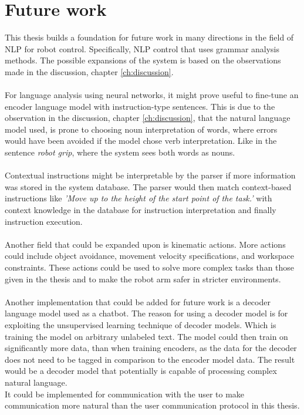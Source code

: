 \chapter{Future work} \label{ch:future_work}
This thesis builds a foundation for future work in many directions in the field of NLP for robot control. Specifically, NLP control that uses grammar analysis methods. The possible expansions of the system is based on the observations made in the discussion, chapter \ref{ch:discussion}.
\\\\
For language analysis using neural networks, it might prove useful to fine-tune an encoder language model with instruction-type sentences. This is due to the observation in the discussion, chapter \ref{ch:discussion}, that the natural language model used, is prone to choosing noun interpretation of words, where errors would have been avoided if the model chose verb interpretation. Like in the sentence \textit{robot grip}, where the system sees both words as nouns.
\\\\
Contextual instructions might be interpretable by the parser if more information was stored in the system database. The parser would then match context-based instructions like \textit{'Move up to the height of the start point of the task.'} with context knowledge in the database for instruction interpretation and finally instruction execution.
\\\\
Another field that could be expanded upon is kinematic actions. More actions could include object avoidance, movement velocity specifications, and workspace constraints. These actions could be used to solve more complex tasks than those given in the thesis and to make the robot arm safer in stricter environments. 
\\\\
Another implementation that could be added for future work is a decoder language model used as a chatbot. The reason for using a decoder model is for exploiting the unsupervised learning technique of decoder models. Which is training the model on arbitrary unlabeled text. The model could then train on significantly more data, than when training encoders, as the data for the decoder does not need to be tagged in comparison to the encoder model data. The result would be a decoder model that potentially is capable of processing complex natural language. 
\\
It could be implemented for communication with the user to make communication more natural than the user communication protocol in this thesis.
